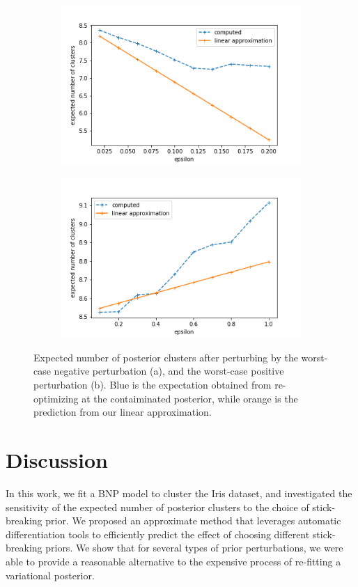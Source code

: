 \documentclass[a4paper]{article}
\begin{document}
\begin{figure}[h!]
	\centering
	\begin{subfigure}[t]{0.4\textwidth}
		\includegraphics[width = \textwidth]{./func_sens_results/worst_case_neg_influence_results.png}
		\subcaption{}
	\end{subfigure}
  \begin{subfigure}[t]{0.4\textwidth}
    \includegraphics[width = \textwidth]{./func_sens_results/worst_case_pos_influence_results.png}
    \subcaption{}
  \end{subfigure}
  \caption{Expected number of posterior clusters after perturbing by the worst-case
  negative perturbation (a), and the worst-case positive perturbation (b). Blue is the
  expectation obtained from re-optimizing at the contaiminated posterior, while
  orange is the prediction from our linear approximation. }
  \label{fig:worst_case_results}
\end{figure}

\section{Discussion}
In this work, we fit a BNP model to cluster the Iris dataset, and
investigated the sensitivity of the expected number of
posterior clusters to the choice of stick-breaking prior. We proposed an approximate
method that leverages automatic differentiation tools
to efficiently predict the effect of choosing different stick-breaking priors. We show
that for several types of prior perturbations, we were able to provide a reasonable
alternative to the expensive process of re-fitting a variational posterior.
\end{document}
